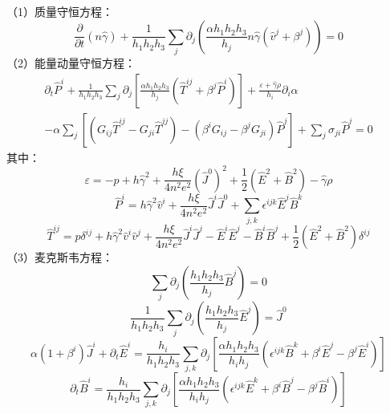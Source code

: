 \documentclass[lang=cn,color=blue,cm,11pt,scheme=chinese,bibend=bibtex,sorting=nty]{elegantbook}
\begin{document}
	（1）质量守恒方程：
	\begin{equation}
		\frac{\partial}{\partial t} (n \hat{\gamma}) + \frac{1}{h_1 h_2 h_3} \sum_j \partial_j \left( \frac{\alpha h_1 h_2 h_3}{h_j} n \hat{\gamma} (\hat{v}^j + \beta^j) \right) = 0
	\end{equation}
	（2）能量动量守恒方程：
	\begin{multline}
		\partial_t \hat{P}^i + \frac{1}{h_1 h_2 h_3} \sum_j \partial_j \left[ \frac{\alpha h_1 h_2 h_3}{h_j} ( \hat{T}^{i j} + \beta^j \hat{P}^i) \right] + \frac{\varepsilon + \hat{\gamma} \rho}{h_i} \partial_i \alpha \\
		- \alpha \sum_j [(G_{i j} \hat{T}^{i j} - G_{j i} \hat{T}^{j j}) - (\beta^i G_{i j} - \beta^j G_{j i}) \hat{P}^j] + \sum_j \sigma_{j i} \hat{P}^j = 0
	\end{multline}
	其中：
	\begin{equation}
		\varepsilon = - p + h \hat{\gamma}^2 + \frac{h \xi}{4 n^2 e^2} (\hat{J}^0)^2 + \frac{1}{2} (\hat{E}^2 + \hat{B}^2) - \hat{\gamma} \rho
	\end{equation}
	\begin{equation}
		\hat{P}^i = h \hat{\gamma}^2 \hat{v}^i + \frac{h \xi}{4 n^2 e^2} \hat{J}^i \hat{J}^0 + \sum_{j, k} \epsilon^{i j k} \hat{E}^j \hat{B}^k
	\end{equation}
	\begin{equation}
		\hat{T}^{i j} = p \delta^{i j} + h \hat{\gamma}^2 \hat{v}^i \hat{v}^j + \frac{h \xi}{4 n^2 e^2} \hat{J}^i \hat{J}^j - \hat{E}^i \hat{E}^j - \hat{B}^i \hat{B}^j + \frac{1}{2} (\hat{E}^2 + \hat{B}^2) \delta^{i j}
	\end{equation}
	（3）麦克斯韦方程：
	\begin{equation}
		\sum_j \partial_j \left( \frac{h_1 h_2 h_3}{h_j} \hat{B}^j \right) = 0
	\end{equation}
	\begin{equation}
		\frac{1}{h_1 h_2 h_3} \sum_j \partial_j \left( \frac{h_1 h_2 h_3}{h_j} \hat{E}^j \right) = \hat{J}^0
	\end{equation}
	\begin{equation}
		\alpha (1 + \beta^i) \hat{J}^i + \partial_t \hat{E}^i = \frac{h_i}{h_1 h_2 h_3} \sum_{j, k} \partial_j \left[ \frac{\alpha h_1 h_2 h_3}{h_i h_j} (\epsilon^{i j k} \hat{B}^k + \beta^i \hat{E}^j - \beta^j \hat{E}^i) \right]
	\end{equation}
	\begin{equation}
		\partial_t \hat{B}^i = \frac{h_i}{h_1 h_2 h_3} \sum_{j, k} \partial_j \left[ \frac{\alpha h_1 h_2 h_3}{h_i h_j} (\epsilon^{i j k} \hat{E}^k + \beta^i \hat{B}^j - \beta^j \hat{B}^i) \right]
	\end{equation}
\end{document}
